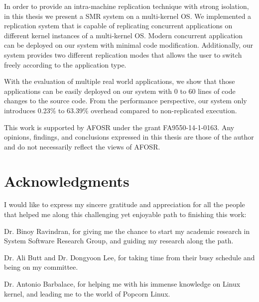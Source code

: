 \documentclass[12pt]{report}
\begin{document}
In order to provide an intra-machine replication technique with strong isolation, in this thesis we present a SMR system on a multi-kernel OS. We implemented a replication system that is capable of replicating concurrent applications on different kernel instances of a multi-kernel OS. Modern concurrent application can be deployed on our system with minimal code modification. Additionally, our system provides two different replication modes that allows the user to switch freely according to the application type.

With the evaluation of multiple real world applications, we show that those applications can be easily deployed on our system with 0 to 60 lines of code changes to the source code. From the performance perspective, our system only introduces 0.23\% to 63.39\% overhead compared to non-replicated execution. 

\vfill


This work is supported by AFOSR under the grant FA9550-14-1-0163.  Any opinions, findings, and conclusions expressed in this thesis are those of the author and do not necessarily reflect the views of AFOSR.

\pagebreak

\chapter*{Acknowledgments}
I would like to express my sincere gratitude and appreciation for all the people that helped me along this challenging yet enjoyable path to finishing this work:

Dr. Binoy Ravindran, for giving me the chance to start my academic research in System Software Research Group, and guiding my research along the path.

Dr. Ali Butt and Dr. Dongyoon Lee, for taking time from their busy schedule and being on my committee.

Dr. Antonio Barbalace, for helping me with his immense knowledge on Linux kernel, and leading me to the world of Popcorn Linux.
\end{document}
